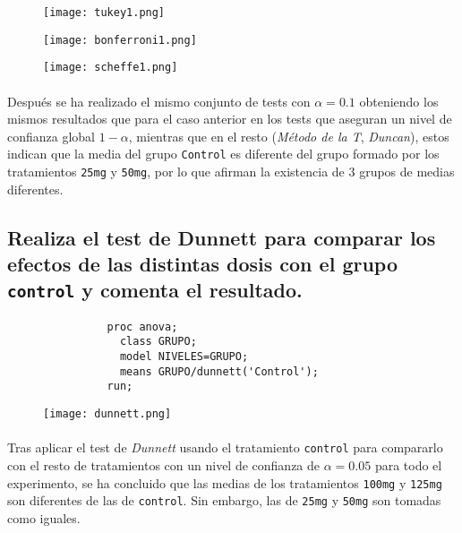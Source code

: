 \documentclass{article}
\begin{document}
      \begin{figure}[H]
        \centering
        \texttt{[image: tukey1.png]}
      \end{figure}

      \begin{figure}[H]
        \centering
        \texttt{[image: bonferroni1.png]}
      \end{figure}

      \begin{figure}[H]
        \centering
        \texttt{[image: scheffe1.png]}
      \end{figure}

      \paragraph{}
      Después se ha realizado el mismo conjunto de tests con $\alpha = 0.1$ obteniendo los mismos resultados que para el caso anterior en los tests que aseguran un nivel de confianza global $1-\alpha$, mientras que en el resto (\emph{Método de la T}, \emph{Duncan}), estos indican que la media del grupo \texttt{Control} es diferente del grupo formado por los tratamientos \texttt{25mg} y \texttt{50mg}, por lo que afirman la existencia de 3 grupos de medias diferentes.

    \subsection{Realiza el test de Dunnett para comparar los efectos de las distintas dosis con el grupo \texttt{control} y comenta el resultado.}

      \begin{figure}[h]
        \centering
        \begin{verbatim}
          proc anova;
            class GRUPO;
            model NIVELES=GRUPO;
            means GRUPO/dunnett('Control');
          run;
        \end{verbatim}
        \label{code:sas_6}
      \end{figure}

      \begin{figure}[H]
        \centering
        \texttt{[image: dunnett.png]}
      \end{figure}

      \paragraph{}
      Tras aplicar el test de \emph{Dunnett} usando el tratamiento \texttt{control} para compararlo con el resto de tratamientos con un nivel de confianza de $\alpha=0.05$ para todo el experimento, se ha concluido que las medias de los tratamientos \texttt{100mg} y \texttt{125mg} son diferentes de las de \texttt{control}. Sin embargo, las de \texttt{25mg} y \texttt{50mg} son tomadas como iguales.
\end{document}

